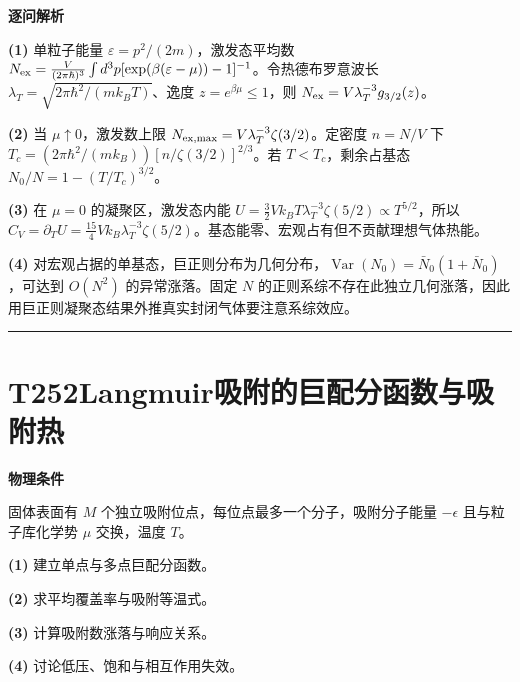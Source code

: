 \documentclass[UTF8,a4paper,11pt,oneside,openany]{ctexbook}
\begin{document}
\par\medskip\noindent\textbf{逐问解析}
\par\noindent\textbf{(1)} 单粒子能量 \(\varepsilon=p^2/(2m)\)，激发态平均数 \(N_{\rm ex}=\frac{V}{(2\pi\hbar)^3}\int d^3p[\exp(\beta(\varepsilon-\mu))-1]^{-1}\)。令热德布罗意波长 \(\lambda_T=\sqrt{2\pi\hbar^2/(mk_BT)}\)、逸度 \(z=e^{\beta\mu}\le1\)，则 \(N_{\rm ex}=V\lambda_T^{-3}g_{3/2}(z)\)。
\par\noindent\textbf{(2)} 当 \(\mu\uparrow0\)，激发数上限 \(N_{\rm ex,max}=V\lambda_T^{-3}\zeta(3/2)\)。定密度 \(n=N/V\) 下 \(T_c=(2\pi\hbar^2/(mk_B))[n/\zeta(3/2)]^{2/3}\)。若 \(T<T_c\)，剩余占基态 \(N_0/N=1-(T/T_c)^{3/2}\)。
\par\noindent\textbf{(3)} 在 \(\mu=0\) 的凝聚区，激发态内能 \(U=\tfrac32 Vk_BT\lambda_T^{-3}\zeta(5/2)\propto T^{5/2}\)，所以 \(C_V=\partial_TU=\tfrac{15}{4}Vk_B\lambda_T^{-3}\zeta(5/2)\)。基态能零、宏观占有但不贡献理想气体热能。
\par\noindent\textbf{(4)} 对宏观占据的单基态，巨正则分布为几何分布，\(\operatorname{Var}(N_0)=\bar N_0(1+\bar N_0)\)，可达到 \(O(N^2)\) 的异常涨落。固定 \(N\) 的正则系综不存在此独立几何涨落，因此用巨正则凝聚态结果外推真实封闭气体要注意系综效应。

\par\bigskip\hrule\bigskip
\section*{T252\quad Langmuir吸附的巨配分函数与吸附热}
\textbf{物理条件}\par 固体表面有 \(M\) 个独立吸附位点，每位点最多一个分子，吸附分子能量 \(-\epsilon\) 且与粒子库化学势 \(\mu\) 交换，温度 \(T\)。
\par\noindent\textbf{(1)} 建立单点与多点巨配分函数。
\par\noindent\textbf{(2)} 求平均覆盖率与吸附等温式。
\par\noindent\textbf{(3)} 计算吸附数涨落与响应关系。
\par\noindent\textbf{(4)} 讨论低压、饱和与相互作用失效。
\end{document}
